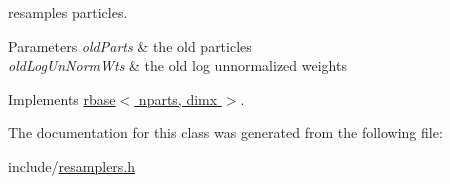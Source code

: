 resamples particles. 


\begin{DoxyParams}{Parameters}
{\em old\+Parts} & the old particles \\
\hline
{\em old\+Log\+Un\+Norm\+Wts} & the old log unnormalized weights \\
\hline
\end{DoxyParams}


Implements \hyperlink{classrbase_ad14a177d1beb6fae9ee8370c29f46da9}{rbase$<$ nparts, dimx $>$}.



The documentation for this class was generated from the following file\+:\begin{DoxyCompactItemize}
\item 
include/\hyperlink{resamplers_8h}{resamplers.\+h}\end{DoxyCompactItemize}
